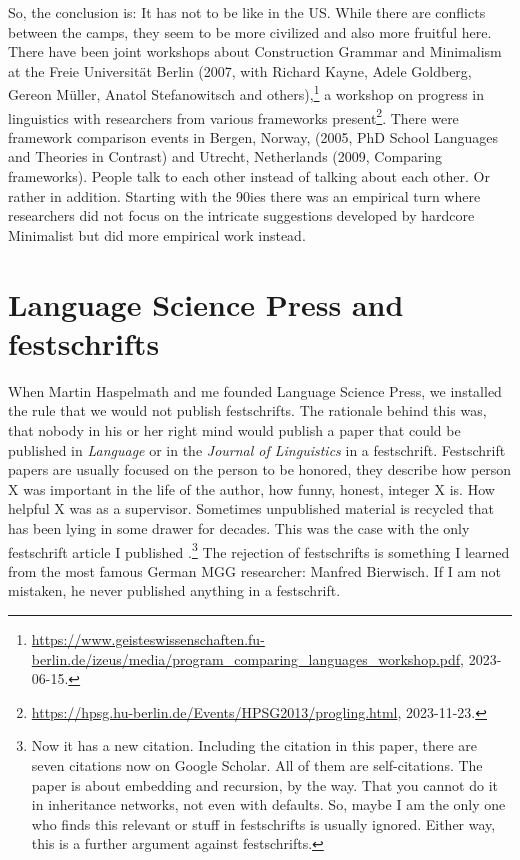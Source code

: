 \documentclass[output=paper,colorlinks,citecolor=brown]{langscibook}
\begin{document}
So, the conclusion is: It has not to be like in the US. While there are conflicts between the camps,
they seem to be more civilized and also more fruitful here. There have been joint workshops about
Construction Grammar and Minimalism at the Freie Universität Berlin (2007, with Richard Kayne, Adele
Goldberg, Gereon Müller, Anatol Stefanowitsch and others),\footnote{
\url{https://www.geisteswissenschaften.fu-berlin.de/izeus/media/program_comparing_languages_workshop.pdf},
2023-06-15.
} a workshop on progress
in linguistics with researchers from various frameworks present\footnote{
\url{https://hpsg.hu-berlin.de/Events/HPSG2013/progling.html}, 2023-11-23.
}. There were framework comparison
events in Bergen, Norway, (2005, PhD School Languages and Theories in Contrast) and Utrecht,
Netherlands (2009, Comparing frameworks). People talk to each
other instead of talking about each other. Or rather in addition. Starting with the 90ies there was an empirical
turn where researchers did not focus on the intricate suggestions developed by hardcore Minimalist
but did more empirical work instead.


\section{Language Science Press and festschrifts}

When Martin Haspelmath and me founded Language Science Press, we installed the rule that we would
not publish festschrifts. The rationale behind this was, that nobody in his or her right mind would
publish a paper that could be published in \emph{Language} or in the \emph{Journal of Linguistics} in a
festschrift. Festschrift papers are usually focused on the person to be honored, they describe how
person X was important in the life of the author, how funny, honest, integer X is. How helpful X was
as a supervisor. Sometimes
unpublished material is recycled that has been lying in some drawer for decades. This was the case
with the only festschrift article I published \citep{MuellerDefaults}.\footnote{
  Now it has a new citation. Including the citation in this paper, there are seven citations now on
  Google Scholar. All of them are self-citations. The paper is about embedding and recursion, by the way. That you
  cannot do it in inheritance networks, not even with defaults. So, maybe I am the only one who
  finds this relevant or stuff in festschrifts is usually ignored. Either way, this is a further
  argument against festschrifts.
}
The rejection of festschrifts is something I learned from the most famous German MGG researcher:
Manfred Bierwisch. If I am not mistaken, he never published anything in a festschrift.
\end{document}
